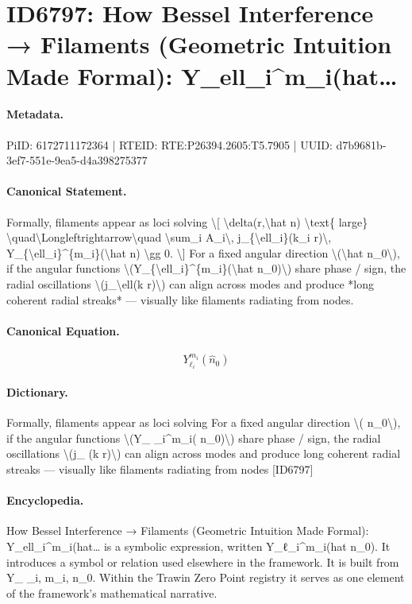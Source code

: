 \section*{ID6797: How Bessel Interference → Filaments (Geometric Intuition Made Formal): Y\_ell\_i\textasciicircum{}m\_i(hat…}
\paragraph{Metadata.}
PiID: 6172711172364 | RTEID: RTE:P26394.2605:T5.7905 | UUID: d7b9681b-3ef7-551e-9ea5-d4a398275377

\paragraph{Canonical Statement.}
Formally, filaments appear as loci solving \textbackslash{}[ \textbackslash{}delta(r,\textbackslash{}hat n) \textbackslash{}text\{ large\} \textbackslash{}quad\textbackslash{}Longleftrightarrow\textbackslash{}quad \textbackslash{}sum\_i A\_i\textbackslash{}, j\_\{\textbackslash{}ell\_i\}(k\_i r)\textbackslash{}, Y\_\{\textbackslash{}ell\_i\}\textasciicircum{}\{m\_i\}(\textbackslash{}hat n) \textbackslash{}gg 0. \textbackslash{}] For a fixed angular direction \textbackslash{}(\textbackslash{}hat n\_0\textbackslash{}), if the angular functions \textbackslash{}(Y\_\{\textbackslash{}ell\_i\}\textasciicircum{}\{m\_i\}(\textbackslash{}hat n\_0)\textbackslash{}) share phase / sign, the radial oscillations \textbackslash{}(j\_\textbackslash{}ell(k r)\textbackslash{}) can align across modes and produce *long coherent radial streaks* — visually like filaments radiating from nodes.

\paragraph{Canonical Equation.}
\[
Y_{\ell_i}^{m_i}(\hat n_0)
\]

\paragraph{Dictionary.}
Formally, filaments appear as loci solving For a fixed angular direction \textbackslash{}( n\_0\textbackslash{}), if the angular functions \textbackslash{}(Y\_ \_i\textasciicircum{}m\_i( n\_0)\textbackslash{}) share phase / sign, the radial oscillations \textbackslash{}(j\_ (k r)\textbackslash{}) can align across modes and produce long coherent radial streaks — visually like filaments radiating from nodes [ID6797]

\paragraph{Encyclopedia.}
How Bessel Interference → Filaments (Geometric Intuition Made Formal): Y\_ell\_i\textasciicircum{}m\_i(hat… is a symbolic expression, written Y\_ℓ\_i\textasciicircum{}m\_i(hat n\_0). It introduces a symbol or relation used elsewhere in the framework. It is built from Y\_ \_i, m\_i, n\_0. Within the Trawin Zero Point registry it serves as one element of the framework's mathematical narrative.

